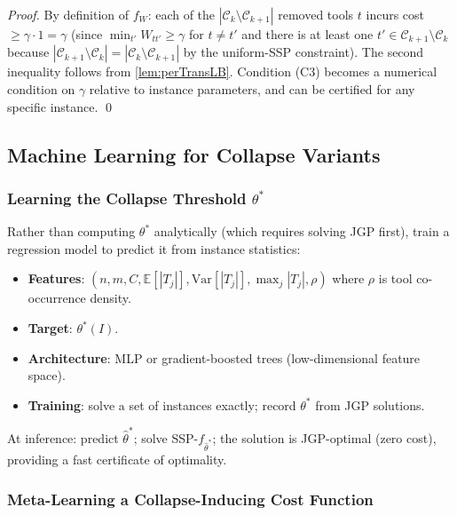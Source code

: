 \documentclass[11pt,a4paper]{article}
\theoremstyle{plain}
\theoremstyle{definition}
\begin{document}
\begin{proof}
By definition of $f_W$: each of the $|\mathcal{C}_k \setminus \mathcal{C}_{k+1}|$ removed
tools $t$ incurs cost $\ge \gamma \cdot 1 = \gamma$ (since $\min_{t'} W_{tt'} \ge \gamma$
for $t \ne t'$ and there is at least one $t' \in \mathcal{C}_{k+1} \setminus \mathcal{C}_k$
because $|\mathcal{C}_{k+1} \setminus \mathcal{C}_k| = |\mathcal{C}_k \setminus \mathcal{C}_{k+1}|$
by the uniform-SSP constraint). The second inequality follows from \cref{lem:perTransLB}.
Condition (C3) becomes a numerical condition on $\gamma$ relative to instance parameters,
and can be certified for any specific instance. \qed
\end{proof}

\subsection{Machine Learning for Collapse Variants}
\label{sec:ML-collapse}

\subsubsection{Learning the Collapse Threshold $\theta^*$}

Rather than computing $\theta^*$ analytically (which requires solving JGP first), train
a regression model to predict it from instance statistics:
\begin{itemize}
  \item \textbf{Features}: $(n, m, C, \mathbb{E}[|T_j|], \mathrm{Var}[|T_j|],
        \max_j|T_j|, \rho)$ where $\rho$ is tool co-occurrence density.
  \item \textbf{Target}: $\theta^*(I)$.
  \item \textbf{Architecture}: MLP or gradient-boosted trees (low-dimensional feature space).
  \item \textbf{Training}: solve a set of instances exactly; record $\theta^*$ from JGP solutions.
\end{itemize}

\noindent At inference: predict $\hat{\theta}^*$; solve SSP-$f_{\hat{\theta}^*}$;
the solution is JGP-optimal (zero cost), providing a fast certificate of optimality.

\subsubsection{Meta-Learning a Collapse-Inducing Cost Function}
\label{sec:meta-learning}
\end{document}
